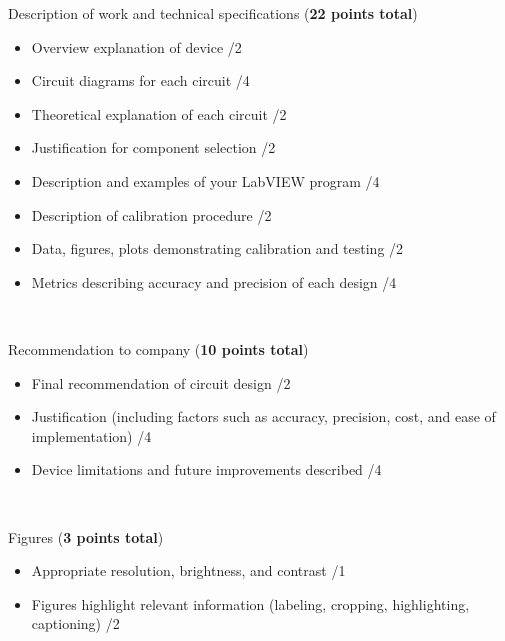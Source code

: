 \documentclass{article}
\begin{document}
Description of work and technical specifications (\textbf{22 points total})
\begin{small}
\begin{itemize}
	\item Overview explanation of device \hfill \underline{\hspace{1cm}}/2
	\item Circuit diagrams for each circuit \hfill \underline{\hspace{1cm}}/4
	\item Theoretical explanation of each circuit \hfill \underline{\hspace{1cm}}/2
	\item Justification for component selection \hfill \underline{\hspace{1cm}}/2
	\item Description and examples of your LabVIEW program \hfill \underline{\hspace{1cm}}/4
	\item Description of calibration procedure \hfill \underline{\hspace{1cm}}/2
	\item Data, figures, plots demonstrating calibration and testing \hfill \underline{\hspace{1cm}}/2
	\item Metrics describing accuracy and precision of each design \hfill \underline{\hspace{1cm}}/4
\end{itemize}	
\end{small}\

Recommendation to company (\textbf{10 points total})
\begin{small}
\begin{itemize}
	\item Final recommendation of circuit design \hfill \underline{\hspace{1cm}}/2
	\item Justification (including factors such as accuracy, precision, cost, and ease of implementation) \hfill \underline{\hspace{1cm}}/4
	\item Device limitations and future improvements described \hfill \underline{\hspace{1cm}}/4
\end{itemize}	
\end{small}\

Figures (\textbf{3 points total})
\begin{small}
\begin{itemize}
	\item Appropriate resolution, brightness, and contrast \hfill \underline{\hspace{1cm}}/1
	\item Figures highlight relevant information (labeling, cropping, highlighting, captioning) \hfill \underline{\hspace{1cm}}/2
\end{itemize}
\end{small}\
\end{document}
